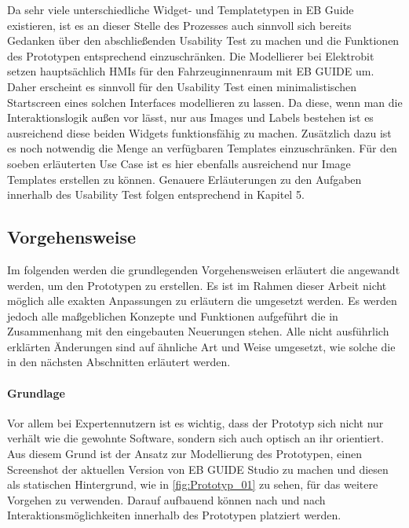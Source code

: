 Da sehr viele unterschiedliche Widget- und Templatetypen in EB Guide existieren, ist es an dieser Stelle des Prozesses auch sinnvoll sich bereits Gedanken über den abschließenden Usability Test zu machen und die Funktionen des Prototypen entsprechend einzuschränken.
Die Modellierer bei Elektrobit setzen hauptsächlich HMIs für den Fahrzeuginnenraum mit EB GUIDE um.
Daher erscheint es sinnvoll für den Usability Test einen minimalistischen Startscreen eines solchen Interfaces modellieren zu lassen.
Da diese, wenn man die Interaktionslogik außen vor lässt, nur aus Images und Labels bestehen ist es ausreichend diese beiden Widgets funktionsfähig zu machen.
Zusätzlich dazu ist es noch notwendig die Menge an verfügbaren Templates einzuschränken.
Für den soeben erläuterten Use Case ist es hier ebenfalls ausreichend nur Image Templates erstellen zu können.
Genauere Erläuterungen zu den Aufgaben innerhalb des Usability Test folgen entsprechend in Kapitel 5.


\subsection{Vorgehensweise}
Im folgenden werden die grundlegenden Vorgehensweisen erläutert die angewandt werden, um den Prototypen zu erstellen.
Es ist im Rahmen dieser Arbeit nicht möglich alle exakten Anpassungen zu erläutern die umgesetzt werden.
Es werden jedoch alle maßgeblichen Konzepte und Funktionen aufgeführt die in Zusammenhang mit den eingebauten Neuerungen stehen.
Alle nicht ausführlich erklärten Änderungen sind auf ähnliche Art und Weise umgesetzt, wie solche die in den nächsten Abschnitten erläutert werden.

\paragraph{Grundlage}
Vor allem bei Expertennutzern ist es wichtig, dass der Prototyp sich nicht nur verhält wie die  gewohnte Software, sondern sich auch optisch an ihr orientiert.
Aus diesem Grund ist der Ansatz zur Modellierung des Prototypen, einen Screenshot der aktuellen Version von EB GUIDE Studio zu machen und diesen als statischen Hintergrund, wie in \cref{fig:Prototyp_01} zu sehen, für das weitere Vorgehen zu verwenden.
Darauf aufbauend können nach und nach Interaktionsmöglichkeiten innerhalb des Prototypen platziert werden.

